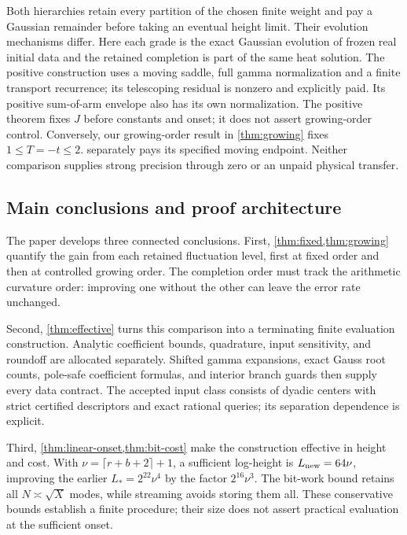 Both hierarchies retain every partition of the chosen finite weight
and pay a Gaussian remainder before taking an eventual height limit.
Their evolution mechanisms differ. Here each grade is the exact
Gaussian evolution of frozen real initial data and the retained
completion is part of the same heat solution. The positive construction
uses a moving saddle, full gamma normalization and a finite transport
recurrence; its telescoping residual is nonzero and explicitly paid.
Its positive sum-of-arm envelope also has its own normalization.
The positive theorem fixes \(J\) before constants and onset; it does
not assert growing-order control. Conversely, our growing-order
result in \cref{thm:growing} fixes \(1\le T=-t\le2\).
 separately pays its specified moving
endpoint. Neither comparison supplies strong precision through zero or
an unpaid physical transfer.

\subsection{Main conclusions and proof architecture}
The paper develops three connected conclusions. First,
\cref{thm:fixed,thm:growing} quantify the gain from each retained
fluctuation level, first at fixed order and then at controlled growing
order. The completion order must track the arithmetic curvature order:
improving one without the other can leave the error rate unchanged.

Second, \cref{thm:effective} turns this comparison into a terminating
finite evaluation construction. Analytic coefficient bounds, quadrature,
input sensitivity, and roundoff are allocated separately. Shifted gamma
expansions, exact Gauss root counts, pole-safe coefficient formulas, and
interior branch guards then supply every data contract. The accepted
input class consists of dyadic centers with strict certified descriptors
and exact rational queries; its separation dependence is explicit.

Third, \cref{thm:linear-onset,thm:bit-cost} make the construction
effective in height and cost. With \(\nu=\lceil r+b+2\rceil+1\),
a sufficient log-height is \(L_{\rm new}=64\nu\), improving the earlier
\(L_*=2^{22}\nu^4\) by the factor \(2^{16}\nu^3\). The bit-work bound
retains all \(N\asymp\sqrt X\) modes, while streaming avoids storing
them all. These conservative bounds establish a finite procedure; their
size does not assert practical evaluation at the sufficient onset.

